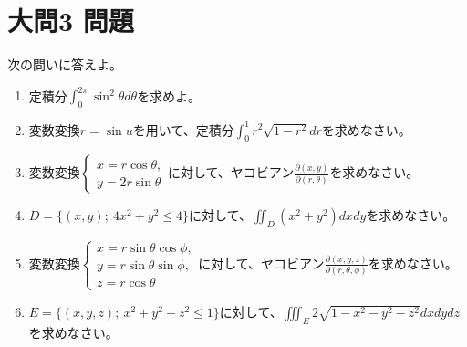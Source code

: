 \documentclass[dvipdfmx]{jsreport}
\begin{document}
\section{大問3 問題}
\begin{tcolorbox} %
	次の問いに答えよ。
\begin{enumerate}
	\item 定積分$\int_0^{2\pi} \sin^2{\theta}d\theta$を求めよ。
	\item 変数変換$r= \sin{u}$を用いて、定積分$\int_0^1 r^2\sqrt{1- r^2}dr$を求めなさい。
	\item 変数変換$\begin{cases}x= r\cos{\theta},\\ y= 2r\sin{\theta}\end{cases}$に対して、ヤコビアン$\frac{\partial(x, y)}{\partial(r, \theta)}$を求めなさい。
	\item $D= \{(x, y);\ 4x^2+ y^2\le 4\}$に対して、$\iint_D (x^2+ y^2)dxdy$を求めなさい。
	\item 変数変換$\begin{cases}x= r\sin{\theta}\cos{\phi},\\ y= r\sin{\theta}\sin{\phi},\\ z= r\cos{\theta} \end{cases}$に対して、ヤコビアン$\frac{\partial(x, y, z)}{\partial(r, \theta, \phi)}$を求めなさい。
	\item $E= \{(x, y, z);\ x^2+ y^2+ z^2\le 1\}$に対して、$\iiint_E 2\sqrt{1- x^2- y^2- z^2}dxdydz$を求めなさい。
\end{enumerate}
\end{tcolorbox}
\end{document}
